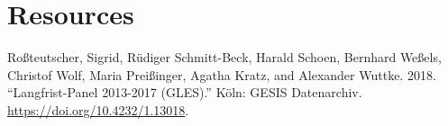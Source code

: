 \documentclass[
]{article}
\newlength{\cslhangindent}
\newlength{\cslentryspacingunit} %
\newenvironment{CSLReferences}[2] %
 {%
  \setlength{\parindent}{0pt}
  \ifodd #1
  \let\oldpar\par
  \def\par{\hangindent=\cslhangindent\oldpar}
  \fi
  \setlength{\parskip}{#2\cslentryspacingunit}
 }%
 {}
\begin{document}
\hypertarget{resources}{%
\section*{Resources}\label{resources}}

\hypertarget{refs}{}
\begin{CSLReferences}{1}{0}
\leavevmode{}%
Roßteutscher, Sigrid, Rüdiger Schmitt-Beck, Harald Schoen, Bernhard Weßels, Christof Wolf, Maria Preißinger, Agatha Kratz, and Alexander Wuttke. 2018. {``{Langfrist-Panel 2013-2017 (GLES)}.''} K{ö}ln: GESIS Datenarchiv. \url{https://doi.org/10.4232/1.13018}.

\end{CSLReferences}
\end{document}
